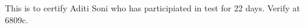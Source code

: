 \documentclass[12pt]{article}
\begin{document}
\thispagestyle{empty}
This is to certify Aditi Soni who has participiated in test for 22 days.
\newline
Verify at 6809c.
\end{document}

